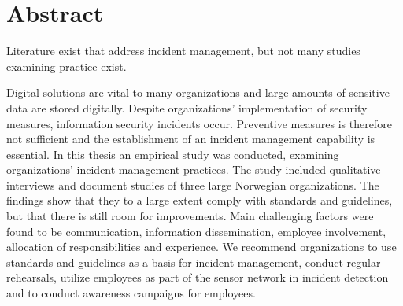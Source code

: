 \chapter*{Abstract}
Literature exist that address incident management, but not many studies examining practice exist.

Digital solutions are vital to many organizations and large amounts of sensitive data are stored digitally. Despite organizations' implementation of security measures, information security incidents occur. Preventive measures is therefore not sufficient and the establishment of an incident management capability is essential. In this thesis an empirical study was conducted, examining organizations' incident management practices. The study included qualitative interviews and document studies of three large Norwegian organizations. The findings show that they to a large extent comply with standards and guidelines, but that there is still room for improvements. Main challenging factors were found to be communication, information dissemination, employee involvement, allocation of responsibilities and experience. We recommend organizations to use standards and guidelines as a basis for incident management, conduct regular rehearsals, utilize employees as part of the sensor network in incident detection and to conduct awareness campaigns for employees.